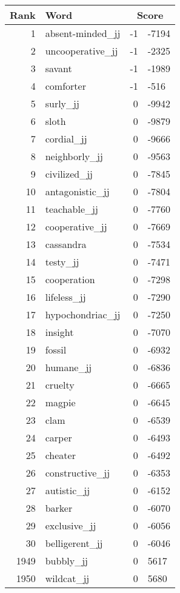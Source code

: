 \begin{longtable}[!htbp]{| rlr@{.}l |}
    \hline
    \textbf{Rank} & \textbf{Word} & \multicolumn{2}{c|}{\textbf{Score}} \\
    \hline
    \endhead
    1 & absent-minded\_jj & -1 & -7194 \\
    2 & uncooperative\_jj & -1 & -2325 \\
    3 & savant & -1 & -1989 \\
    4 & comforter & -1 & -516 \\
    5 & surly\_jj & 0 & -9942 \\
    6 & sloth & 0 & -9879 \\
    7 & cordial\_jj & 0 & -9666 \\
    8 & neighborly\_jj & 0 & -9563 \\
    9 & civilized\_jj & 0 & -7845 \\
    10 & antagonistic\_jj & 0 & -7804 \\
    11 & teachable\_jj & 0 & -7760 \\
    12 & cooperative\_jj & 0 & -7669 \\
    13 & cassandra & 0 & -7534 \\
    14 & testy\_jj & 0 & -7471 \\
    15 & cooperation & 0 & -7298 \\
    16 & lifeless\_jj & 0 & -7290 \\
    17 & hypochondriac\_jj & 0 & -7250 \\
    18 & insight & 0 & -7070 \\
    19 & fossil & 0 & -6932 \\
    20 & humane\_jj & 0 & -6836 \\
    21 & cruelty & 0 & -6665 \\
    22 & magpie & 0 & -6645 \\
    23 & clam & 0 & -6539 \\
    24 & carper & 0 & -6493 \\
    25 & cheater & 0 & -6492 \\
    26 & constructive\_jj & 0 & -6353 \\
    27 & autistic\_jj & 0 & -6152 \\
    28 & barker & 0 & -6070 \\
    29 & exclusive\_jj & 0 & -6056 \\
    30 & belligerent\_jj & 0 & -6046 \\
    1949 & bubbly\_jj & 0 & 5617 \\
    1950 & wildcat\_jj & 0 & 5680 \\

\end{longtable}
